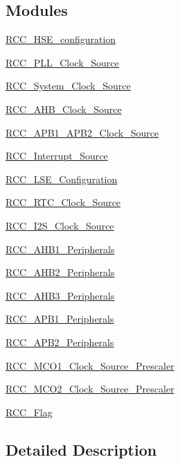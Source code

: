 \subsection*{Modules}
\begin{DoxyCompactItemize}
\item 
\hyperlink{group___r_c_c___h_s_e__configuration}{R\+C\+C\+\_\+\+H\+S\+E\+\_\+configuration}
\item 
\hyperlink{group___r_c_c___p_l_l___clock___source}{R\+C\+C\+\_\+\+P\+L\+L\+\_\+\+Clock\+\_\+\+Source}
\item 
\hyperlink{group___r_c_c___system___clock___source}{R\+C\+C\+\_\+\+System\+\_\+\+Clock\+\_\+\+Source}
\item 
\hyperlink{group___r_c_c___a_h_b___clock___source}{R\+C\+C\+\_\+\+A\+H\+B\+\_\+\+Clock\+\_\+\+Source}
\item 
\hyperlink{group___r_c_c___a_p_b1___a_p_b2___clock___source}{R\+C\+C\+\_\+\+A\+P\+B1\+\_\+\+A\+P\+B2\+\_\+\+Clock\+\_\+\+Source}
\item 
\hyperlink{group___r_c_c___interrupt___source}{R\+C\+C\+\_\+\+Interrupt\+\_\+\+Source}
\item 
\hyperlink{group___r_c_c___l_s_e___configuration}{R\+C\+C\+\_\+\+L\+S\+E\+\_\+\+Configuration}
\item 
\hyperlink{group___r_c_c___r_t_c___clock___source}{R\+C\+C\+\_\+\+R\+T\+C\+\_\+\+Clock\+\_\+\+Source}
\item 
\hyperlink{group___r_c_c___i2_s___clock___source}{R\+C\+C\+\_\+\+I2\+S\+\_\+\+Clock\+\_\+\+Source}
\item 
\hyperlink{group___r_c_c___a_h_b1___peripherals}{R\+C\+C\+\_\+\+A\+H\+B1\+\_\+\+Peripherals}
\item 
\hyperlink{group___r_c_c___a_h_b2___peripherals}{R\+C\+C\+\_\+\+A\+H\+B2\+\_\+\+Peripherals}
\item 
\hyperlink{group___r_c_c___a_h_b3___peripherals}{R\+C\+C\+\_\+\+A\+H\+B3\+\_\+\+Peripherals}
\item 
\hyperlink{group___r_c_c___a_p_b1___peripherals}{R\+C\+C\+\_\+\+A\+P\+B1\+\_\+\+Peripherals}
\item 
\hyperlink{group___r_c_c___a_p_b2___peripherals}{R\+C\+C\+\_\+\+A\+P\+B2\+\_\+\+Peripherals}
\item 
\hyperlink{group___r_c_c___m_c_o1___clock___source___prescaler}{R\+C\+C\+\_\+\+M\+C\+O1\+\_\+\+Clock\+\_\+\+Source\+\_\+\+Prescaler}
\item 
\hyperlink{group___r_c_c___m_c_o2___clock___source___prescaler}{R\+C\+C\+\_\+\+M\+C\+O2\+\_\+\+Clock\+\_\+\+Source\+\_\+\+Prescaler}
\item 
\hyperlink{group___r_c_c___flag}{R\+C\+C\+\_\+\+Flag}
\end{DoxyCompactItemize}


\subsection{Detailed Description}
